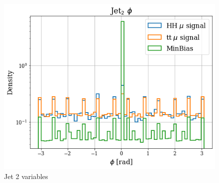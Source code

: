 \documentclass[../main.tex]{subfiles}
\begin{document}
\begin{figure}[!ht]
\begin{minipage}[b]{0.33\linewidth}
    \centering
    \includegraphics[width=1\linewidth]{Chapters/Plots/Hist_1mu_jet2_Phi.png}
  \end{minipage}
  \caption{Jet 2 variables}
\end{figure}
\end{document}
